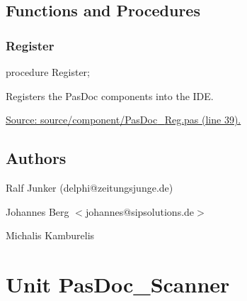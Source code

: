 \documentclass{report}
\newif\ifpdf
\begin{document}
\section{Functions and Procedures}
\ifpdf
\subsection*{\large{\textbf{Register}}\normalsize\hspace{1ex}\hrulefill}
\else
\subsection*{Register}
\fi
\label{PasDoc_Reg-Register}
\begin{list}{}{
\setlength{\itemindent}{0cm}
\setlength{\listparindent}{0cm}
\setlength{\leftmargin}{\evensidemargin}
\addtolength{\leftmargin}{\tmplength}
\settowidth{\labelsep}{X}
\addtolength{\leftmargin}{\labelsep}
\setlength{\labelwidth}{\tmplength}
}
\item[\textbf{Declaration}\hfill]
\ifpdf
\begin{flushleft}
\fi
\begin{ttfamily}
procedure Register;\end{ttfamily}

\ifpdf
\end{flushleft}
\fi

\par
\item[\textbf{Description}]
Registers the PasDoc components into the IDE.\par
\href{https://github.com/pasdoc/pasdoc/blob/master/source/component/PasDoc_Reg.pas#L39}{Source: source/component/PasDoc{\_}Reg.pas (line 39).}

\end{list}
\section{Authors}
\par
Ralf Junker (delphi@zeitungsjunge.de)

\par
Johannes Berg {$<$}johannes@sipsolutions.de{$>$}

\par
Michalis Kamburelis

\chapter{Unit PasDoc{\_}Scanner}
\label{PasDoc_Scanner}
\end{document}

